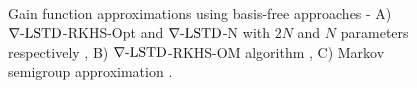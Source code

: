 \begin{figure}[htbp]
	\centering
	\mbox{
		\label{fig:A}
	}
	\mbox{
	}
	\mbox{
	} 
	\caption[$\gradTD$-RKHS algorithms performance comparison]{Gain function approximations using basis-free approaches - A) $\gradTD$-RKHS-Opt and $\gradTD$-N with $2N$ and $N$ parameters respectively \cite{radmey18a}, B) $\gradTD$-RKHS-OM algorithm \cite{radmey19}, C) Markov semigroup approximation \cite{tagmeh16}.}
	\label{fig:diff_td_rkhs_coif}
\end{figure}
